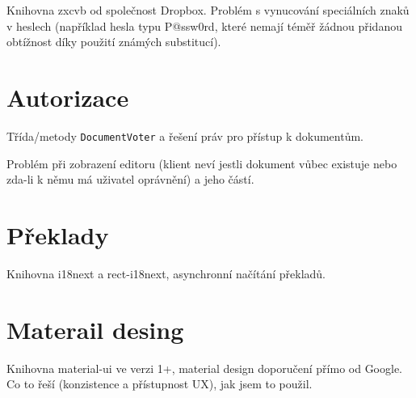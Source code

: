 Knihovna zxcvb od společnost Dropbox.
Problém s vynucování speciálních znaků v heslech (například hesla typu P@ssw0rd, které nemají téměř žádnou přidanou obtížnost díky použití známých substitucí).

\section{Autorizace}

Třída/metody \texttt{DocumentVoter} a řešení práv pro přístup k dokumentům.

Problém při zobrazení editoru (klient neví jestli dokument vůbec existuje nebo zda-li k němu má uživatel oprávnění) a jeho částí.

\section{Překlady}

Knihovna i18next a rect-i18next, asynchronní načítání překladů.

\section{Materail desing}

Knihovna material-ui ve verzi 1+, material design doporučení přímo od Google.
Co to řeší (konzistence a přístupnost UX), jak jsem to použil.


